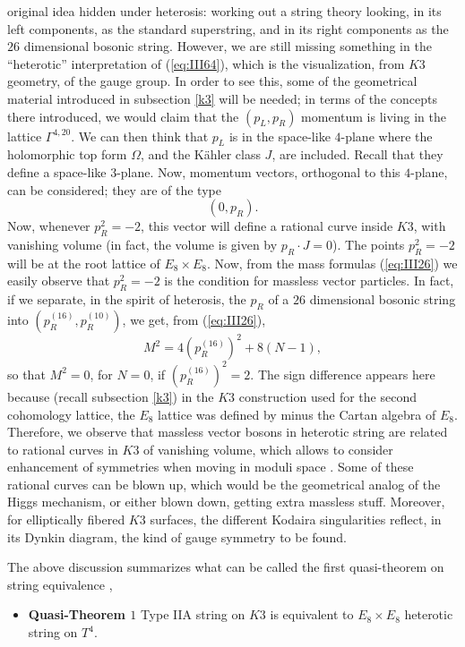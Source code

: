 original idea hidden under heterosis: working out a string theory
looking, in its left components, as the standard superstring, and
in its right components as the $26$ dimensional bosonic string.
However, we are still missing something in the ``heterotic'' 
interpretation of (\ref{eq:III64}), which is the visualization,
from $K3$ geometry, of the gauge group. In order to see this,
some of the geometrical material introduced in subsection 
\ref{k3} will be needed; in terms of the concepts there
introduced, we would claim that the $(p_L,p_R)$ momentum is
living in the lattice $\Gamma^{4,20}$. We can then think that
$p_L$ is in the space-like $4$-plane where the holomorphic top
form $\Omega$, and the K\"ahler class $J$, are included. Recall
that they define a space-like $3$-plane. Now, momentum vectors,
orthogonal to this $4$-plane, can be considered; they are of the
type
\begin{equation}
(0,p_R).
\label{eq:III72a}
\end{equation}
Now, whenever $p_R^2=-2$, this vector will define a rational
curve inside $K3$, with vanishing volume (in fact, the volume is
given by $p_R \cdot J=0$). The points $p_R^2=-2$ will be at the
root lattice of $E_8 \times E_8$. Now, from the mass formulas
(\ref{eq:III26}) we easily observe that $p_R^2=-2$ is the
condition for massless vector particles. In fact, if we separate,
in the spirit of heterosis, the $p_R$ of a $26$ dimensional
bosonic string into $(p_R^{(16)},p_R^{(10)})$, we get, from
(\ref{eq:III26}),
\begin{equation}
M^2 = 4(p_R^{(16)})^2+8(N-1),
\label{eq:III73}
\end{equation}
so that $M^2=0$, for $N\!=\!0$, if $(p_R^{(16)})^2=2$. The sign
difference appears here because (recall subsection \ref{k3}) in
the $K3$ construction used for the second cohomology lattice, the
$E_8$ lattice was defined by minus the Cartan algebra of $E_8$.
Therefore, we observe that massless vector bosons in heterotic
string are related to rational curves in $K3$ of vanishing volume,
which allows to consider enhancement of symmetries when moving in
moduli space \cite{Wsvd,MK,Mayr}. Some of these rational curves can be blown up,
which would be the geometrical analog of the Higgs mechanism, or
either blown down, getting extra massless stuff. Moreover, for
elliptically fibered $K3$ surfaces, the different Kodaira
singularities reflect, in its Dynkin diagram, the kind of gauge
symmetry to be found. 
  
The above discussion summarizes what can be called the first
quasi-theorem on string equivalence \cite{HT,Wsvd},
\begin{itemize}
	\item[{}] {\bf Quasi-Theorem $1$} Type IIA string on $K3$ is
equivalent to $E_8 \times E_8$ heterotic string on $T^4$.
\end{itemize}
  
